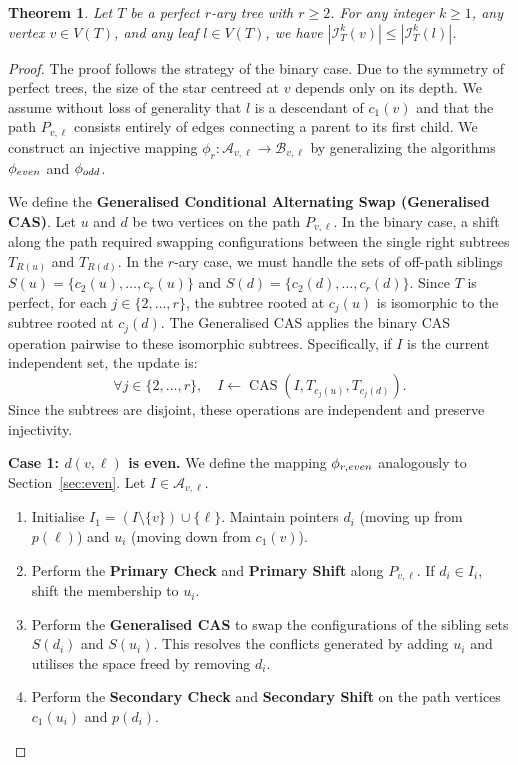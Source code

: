 \documentclass[10pt,a4paper]{amsart}
\newtheorem{theorem}{Theorem}
\DeclareMathOperator{\cas}{CAS}
\begin{document}
\begin{theorem}\label{thm:rarity}
Let $T$ be a perfect $r$-ary tree with $r \geq 2$. For any integer $k \ge 1$, any vertex $v \in V(T)$, and any leaf $l \in V(T)$, we have $|\mathcal{I}_{T}^{k}(v)| \le |\mathcal{I}_{T}^{k}(l)|$.
\end{theorem}

\begin{proof}
The proof follows the strategy of the binary case. Due to the symmetry of perfect trees, the size of the star centreed at $v$ depends only on its depth. We assume without loss of generality that $l$ is a descendant of $c_1(v)$ and that the path $P_{v,\ell}$ consists entirely of edges connecting a parent to its first child. We construct an injective mapping $\phi_r: \mathcal{A}_{v,\ell} \to \mathcal{B}_{v,\ell}$ by generalizing the algorithms $\phi_{\textup{even}}$ and $\phi_{\textup{odd}}$.

We define the \textbf{Generalised Conditional Alternating Swap (Generalised CAS)}. Let $u$ and $d$ be two vertices on the path $P_{v,\ell}$. In the binary case, a shift along the path required swapping configurations between the single right subtrees $T_{R(u)}$ and $T_{R(d)}$. In the $r$-ary case, we must handle the sets of off-path siblings $S(u) = \{c_2(u), \dots, c_r(u)\}$ and $S(d) = \{c_2(d), \dots, c_r(d)\}$. Since $T$ is perfect, for each $j \in \{2, \dots, r\}$, the subtree rooted at $c_j(u)$ is isomorphic to the subtree rooted at $c_j(d)$. The Generalised CAS applies the binary CAS operation pairwise to these isomorphic subtrees. Specifically, if $I$ is the current independent set, the update is:
\[
\forall j \in \{2, \dots, r\}, \quad I \leftarrow \cas(I, T_{c_j(u)}, T_{c_j(d)}).
\]
Since the subtrees are disjoint, these operations are independent and preserve injectivity.

\textbf{Case 1: $d(v,\ell)$ is even.}
We define the mapping $\phi_{r, \textup{even}}$ analogously to Section~\ref{sec:even}. Let $I \in \mathcal{A}_{v,\ell}$.
\begin{enumerate}
    \item Initialise $I_1 = (I \setminus \{v\}) \cup \{\ell\}$. Maintain pointers $d_i$ (moving up from $p(\ell)$) and $u_i$ (moving down from $c_1(v)$).
    \item Perform the \textbf{Primary Check} and \textbf{Primary Shift} along $P_{v,\ell}$. If $d_i \in I_i$, shift the membership to $u_i$.
    \item Perform the \textbf{Generalised CAS} to swap the configurations of the sibling sets $S(d_i)$ and $S(u_i)$. This resolves the conflicts generated by adding $u_i$ and utilises the space freed by removing $d_i$.
    \item Perform the \textbf{Secondary Check} and \textbf{Secondary Shift} on the path vertices $c_1(u_i)$ and $p(d_i)$.
\end{enumerate}


\end{proof}
\end{document}
